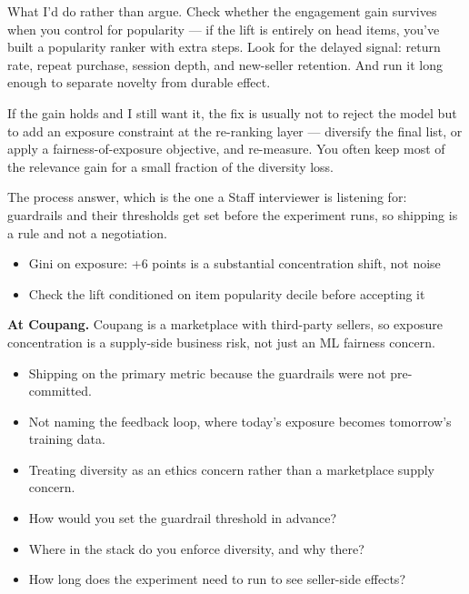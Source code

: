 \documentclass[10pt,twoside]{book}
\newenvironment{callout}{\begin{tcolorbox}[colback=soft,colframe=accent,boxrule=0.5pt,left=7pt,right=7pt,top=5pt,bottom=5pt]}{\end{tcolorbox}}
\newcommand{\lab}[1]{\par\vspace{5pt}\noindent{\sffamily\footnotesize\bfseries\color{accent}#1}\par\vspace{1pt}}
\newcommand{\flab}[1]{\par\vspace{5pt}\noindent{\sffamily\footnotesize\bfseries\color{flag}#1}\par\vspace{1pt}}
\begin{document}
What I'd do rather than argue. Check whether the engagement gain survives when you control for popularity --- if the lift is entirely on head items, you've built a popularity ranker with extra steps. Look for the delayed signal: return rate, repeat purchase, session depth, and new-seller retention. And run it long enough to separate novelty from durable effect.\par\vspace{3pt}
If the gain holds and I still want it, the fix is usually not to reject the model but to add an exposure constraint at the re-ranking layer --- diversify the final list, or apply a fairness-of-exposure objective, and re-measure. You often keep most of the relevance gain for a small fraction of the diversity loss.\par\vspace{3pt}
The process answer, which is the one a Staff interviewer is listening for: guardrails and their thresholds get set before the experiment runs, so shipping is a rule and not a negotiation.\par\vspace{3pt}
\lab{Numbers}
\begin{itemize}
\item Gini on exposure: +6 points is a substantial concentration shift, not noise
\item Check the lift conditioned on item popularity decile before accepting it
\end{itemize}
\begin{callout}\textbf{At Coupang.} Coupang is a marketplace with third-party sellers, so exposure concentration is a supply-side business risk, not just an ML fairness concern.\end{callout}
\flab{Loses the signal}
\begin{itemize}
\item Shipping on the primary metric because the guardrails were not pre-committed.
\item Not naming the feedback loop, where today's exposure becomes tomorrow's training data.
\item Treating diversity as an ethics concern rather than a marketplace supply concern.
\end{itemize}
\lab{Then they ask}
\begin{itemize}
\item How would you set the guardrail threshold in advance?
\item Where in the stack do you enforce diversity, and why there?
\item How long does the experiment need to run to see seller-side effects?
\end{itemize}
\end{document}
